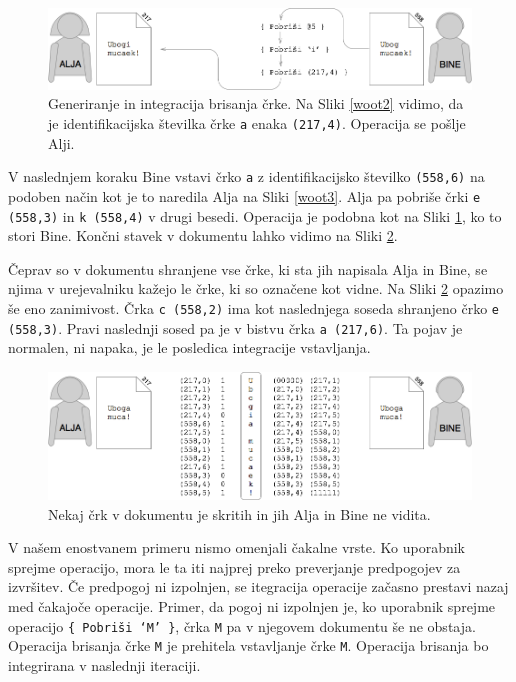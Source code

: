 \documentclass[a4paper, 12pt, twoside]{book}
\begin{document}
\begin{figure}[placement h]
\begin{center}
\includegraphics[width=13cm]{woot4.png}
\end{center}
\caption{Generiranje in integracija brisanja črke. Na Sliki \ref{woot2} vidimo, da je identifikacijska številka črke {\tt a} enaka {\tt (217,4)}. Operacija se pošlje Alji.}
\label{woot4}
\end{figure}

V naslednjem koraku Bine vstavi črko {\tt a} z identifikacijsko številko {\tt (558,6)} na podoben način kot je to naredila Alja na Sliki \ref{woot3}. Alja pa pobriše črki {\tt e (558,3)} in {\tt k (558,4)} v drugi besedi. Operacija je podobna kot na Sliki \ref{woot4}, ko to stori Bine. Končni stavek v dokumentu lahko vidimo na Sliki \ref{woot5}.

Čeprav so v dokumentu shranjene vse črke, ki sta jih napisala Alja in Bine, se njima v urejevalniku kažejo le črke, ki so označene kot vidne. Na Sliki \ref{woot5} opazimo še eno zanimivost. Črka {\tt c (558,2)} ima kot naslednjega soseda shranjeno črko {\tt e (558,3)}. Pravi naslednji sosed pa je v bistvu črka {\tt a (217,6)}. Ta pojav je normalen, ni napaka, je le posledica integracije vstavljanja.

\begin{figure}[placement h]
\begin{center}
\includegraphics[width=13cm]{woot5.png}
\end{center}
\caption{Nekaj črk v dokumentu je skritih in jih Alja in Bine ne vidita.}
\label{woot5}
\end{figure}

V našem enostvanem primeru nismo omenjali čakalne vrste. Ko uporabnik sprejme operacijo, mora le ta iti najprej preko preverjanje predpogojev za izvršitev. Če predpogoj ni izpolnjen, se itegracija operacije začasno prestavi nazaj med čakajoče operacije. Primer, da pogoj ni izpolnjen je, ko uporabnik sprejme operacijo {\tt \{ Pobriši ‘M’ \}}, črka {\tt M} pa v njegovem dokumentu še ne obstaja. Operacija brisanja črke {\tt M} je prehitela vstavljanje črke {\tt M}. Operacija brisanja bo integrirana v naslednji iteraciji.
\end{document}
